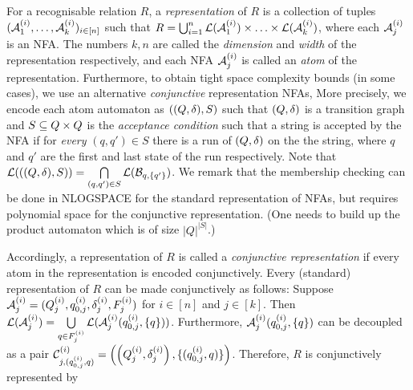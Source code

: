 For a recognisable relation $R$, a \emph{representation} of $R$ is a collection of tuples $(\mathcal{A}^{(i)}_1, \ldots, \mathcal{A}^{(i)}_k)_{i\in [n]}$  such that 
$R = \bigcup_{i=1}^n \mathcal{L}(\mathcal{A}^{(i)}_1) \times \ldots\times \mathcal{L}(\mathcal{A}^{(i)}_k)$, where each $\mathcal{A}^{(i)}_j$ is an NFA. The numbers $k, n$ are called the \emph{dimension} and \emph{width}  of the representation respectively, and each NFA $\mathcal{A}^{(i)}_j$ is called an \emph{atom} of the representation.
%
Furthermore, to obtain tight space complexity bounds (in some cases), we use an alternative  \emph{conjunctive} representation NFAs, %
More precisely, we encode each atom automaton as $((Q, \delta), S)$ such that $(Q, \delta)$ is a transition graph and $S \subseteq Q \times Q$ is the \emph{acceptance condition} such that a string is accepted by the NFA if for \emph{every} $(q, q') \in S$ there is a run of $(Q, \delta)$ on the the string, where $q$ and $q'$ are the first and last state of the run respectively. 
%
Note that $\mathcal{L}(((Q, \delta), S)) = \bigcap \limits_{(q,q') \in S} \mathcal{L}(\mathcal{B}_{q,\{q'\}})$.
We remark that the membership checking  can be done in NLOGSPACE for the standard representation of NFAs, but requires polynomial space for the conjunctive representation. (One needs to build up the product automaton which is of size $|Q|^{|S|}$.) 

%
Accordingly, a representation of $R$ is called a \emph{conjunctive representation} if every atom in the representation is encoded conjunctively.
Every (standard) representation of $R$  can be made conjunctively as follows: 
Suppose $\mathcal{A}^{(i)}_j=(Q^{(i)}_j, q^{(i)}_{0,j}, \delta^{(i)}_j, F^{(i)}_j)$ for $i \in [n]$ and $j \in [k]$. Then $\mathcal{L}(\mathcal{A}^{(i)}_j) = \bigcup \limits_{q \in F^{(i)}_j} \mathcal{L}(\mathcal{A}^{(i)}_j(q^{(i)}_{0,j}, \{q\}))$. Furthermore,  $\mathcal{A}^{(i)}_j(q^{(i)}_{0, j}, \{q\})$ can be decoupled as a pair $\mathcal{C}^{(i)}_{j, (q^{(i)}_{0, j}, q)} = \left(\left(Q^{(i)}_j,  \delta^{(i)}_j \right), \{(q^{(i)}_{0,j}, q)\} \right)$. Therefore, $R$ is conjunctively represented by 
%

